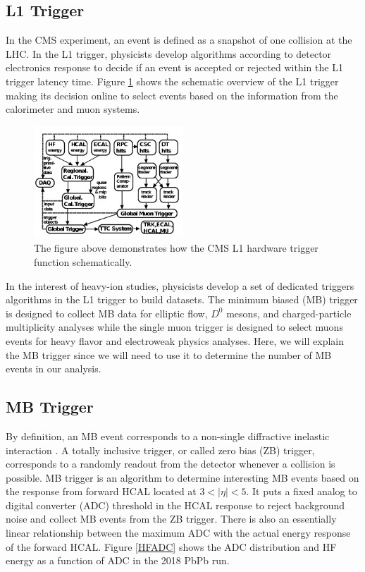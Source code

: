 \subsection{L1 Trigger}

In the CMS experiment, an event is defined as a snapshot of one collision at the LHC. In the L1 trigger, physicists develop algorithms according to detector electronics response to decide if an event is accepted or rejected within the L1 trigger latency time. Figure \ref{L1Overview} shows the schematic overview of the L1 trigger making its decision online to select events based on the information from the calorimeter and muon systems.


\begin{figure}[hbtp]
\begin{center}
\includegraphics[width=0.50\textwidth]{Figures/Chapter3/L1Overview.png}
\caption{The figure above demonstrates how the CMS L1 hardware trigger function schematically.}
\label{L1Overview}
\end{center}
\end{figure} 

In the interest of heavy-ion studies, physicists develop a set of dedicated triggers algorithms in the L1 trigger to build datasets. The minimum biased (MB) trigger is designed to collect MB data for elliptic flow, $D^0$ mesons, and charged-particle multiplicity analyses while the single muon trigger is designed to select muons events for heavy flavor and electroweak physics analyses. Here, we will explain the MB trigger since we will need to use it to determine the number of MB events in our analysis.

\subsection{MB Trigger}

By definition, an MB event corresponds to a non-single diffractive inelastic interaction \cite{MBTrigger}. A totally inclusive trigger, or called zero bias (ZB) trigger, corresponds to a randomly readout from the detector whenever a collision is possible. MB trigger is an algorithm to determine interesting MB events based on the response from forward HCAL located at $3 < |\eta| < 5$. It puts a fixed analog to digital converter (ADC) threshold in the HCAL response to reject background noise and collect MB events from the ZB trigger. There is also an essentially linear relationship between the maximum ADC with the actual energy response of the forward HCAL. Figure \ref{HFADC} shows the ADC distribution and HF energy as a function of ADC in the 2018 PbPb run.


